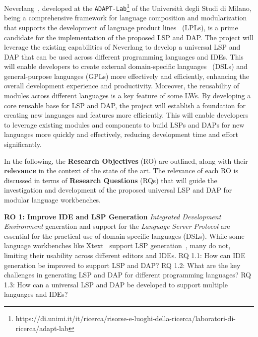 Neverlang~\cite{Cazzola15c, Cazzola14c}, developed at the \texttt{ADAPT-Lab}\footnote{https://di.unimi.it/it/ricerca/risorse-e-luoghi-della-ricerca/laboratori-di-ricerca/adapt-lab} of the Università degli Studi di Milano, being a comprehensive framework for language composition and modularization that supports the development of language product lines~\cite{Cazzola15f, Cazzola21b} (LPLs), is a prime candidate for the implementation of the proposed LSP and DAP. The project will leverage the existing capabilities of Neverlang to develop a universal LSP and DAP that can be used across different programming languages and IDEs. This will enable developers to create external domain-specific languages~\cite{Fowler10} (DSLs) and general-purpose languages (GPLs) more effectively and efficiently, enhancing the overall development experience and productivity. Moreover, the reusability of modules across different languages is a key feature of some LWs. By developing a core reusable base for LSP and DAP, the project will establish a foundation for creating new languages and features more efficiently. This will enable developers to leverage existing modules and components to build LSPs and DAPs for new languages more quickly and effectively, reducing development time and effort significantly.

\hfill \break
In the following, the \textbf{Research Objectives} (RO) are outlined, along with their \textbf{relevance} in the context of the state of the art. The relevance of each RO is discussed in terms of \textbf{Research Questions} (RQs) that will guide the investigation and development of the proposed universal LSP and DAP for modular language workbenches.

\hfill \break
\noindent
\textbf{RO 1: Improve IDE and LSP Generation}
\hfill \break
\textit{Integrated Development Environment} generation and support for the \textit{Language Server Protocol} are essential for the practical use of domain-specific languages (DSLs). While some language workbenches like Xtext~\cite{Bettini13b} support LSP generation~\cite{Barros22}, many do not, limiting their usability across different editors and IDEs.
\hfill \break
\textsf{RQ 1.1}: How can IDE generation be improved to support LSP and DAP?
\hfill \break
\textsf{RQ 1.2}: What are the key challenges in generating LSP and DAP for different programming languages?
\hfill \break
\textsf{RQ 1.3}: How can a universal LSP and DAP be developed to support multiple languages and IDEs?

